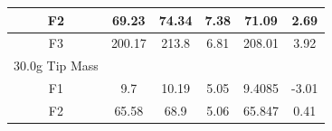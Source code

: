 \documentclass[11pt]{article}
\begin{document}
\begin{table}[H]
\begin{tabular}{|c|c|c|c|c|c|}
F2                                             & 69.23                                                                                                                    & 74.34                                                                 & \cellcolor[HTML]{FFFC9E}7.38                                                                  & 71.09                                                                    &\cellcolor[HTML]{FFFC9E} 2.69                                                                  \\ \hline
F3                                             & 200.17                                                                                                                   & 213.8                                                                 & \cellcolor[HTML]{FFFC9E}6.81                                                                  & 208.01                                                                   & \cellcolor[HTML]{FFFC9E}3.92                                                                  \\ \hline
\rowcolor[HTML]{C0C0C0} 
30.0g Tip Mass                         &                                                                                                                          &                                                                       &                                                                       &                                                                          &                                                                       \\ \hline
F1                                             & 9.7                                                                                                                      & 10.19                                                                 & \cellcolor[HTML]{FFFC9E}5.05                                                                  & 9.4085                                                                   &\cellcolor[HTML]{FFFC9E} -3.01                                                                 \\ \hline
F2                                             & 65.58                                                                                                                    & 68.9                                                                  & \cellcolor[HTML]{FFFC9E}5.06                                                                  & 65.847                                                                   &\cellcolor[HTML]{FFFC9E} 0.41                                                                  \\ \hline

\end{tabular}
\end{table}
\end{document}
